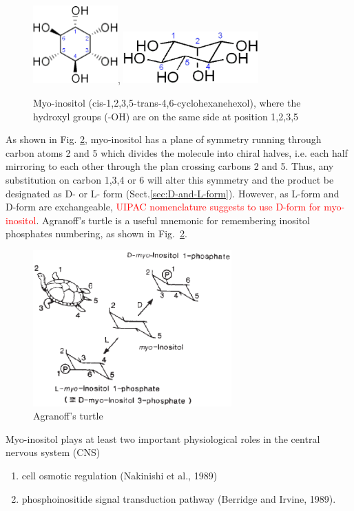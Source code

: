   \begin{figure}[htb]
    \centerline{\includegraphics[height=3cm]{./images/inositol_structure.eps},
\includegraphics[height=2cm]{./images/inositol_chair.eps}}
\caption{Myo-inositol
  (cis-1,2,3,5-trans-4,6-cyclohexanehexol), where the
  hydroxyl groups (-OH) are on the same side at position
  1,2,3,5}\label{fig:inositol}
  \end{figure}

As shown in Fig. \ref{fig:agranoff}, myo-inositol has a plane of symmetry
running through carbon atoms 2 and 5 which divides the molecule into chiral
halves, i.e. each half mirroring to each other through the plan crossing carbons
2 and 5.  Thus, any substitution on carbon 1,3,4 or 6 will alter this symmetry
and the product be designated as D- or L- form (Sect.\ref{sec:D-and-L-form}). 
However, as L-form and D-form are exchangeable, \textcolor{red}{UIPAC
nomenclature suggests to use D-form for myo-inositol}.
Agranoff's turtle is a useful mnemonic for remembering inositol phosphates
numbering, as shown in Fig.~\ref{fig:agranoff}.

\begin{figure}[htb]
  \centerline{\includegraphics[height=6cm]{./images/agranoff_turtle.eps}}
  \caption{Agranoff's turtle}\label{fig:agranoff}
\end{figure}

Myo-inositol plays at least two important physiological roles in the central
nervous system (CNS)
\begin{enumerate}
  
  \item cell osmotic regulation (Nakinishi
et al., 1989)
  
  \item phosphoinositide signal transduction pathway (Berridge
and Irvine, 1989).
\end{enumerate}


